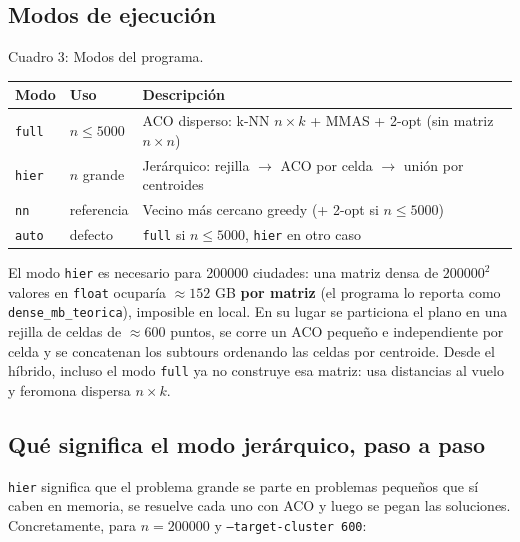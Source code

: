 \documentclass[12pt,a4paper]{article}
\begin{document}
\subsection{Modos de ejecución}

Cuadro 3: Modos del programa.
\begin{center}
\begin{tabular}{lll}
\toprule
Modo & Uso & Descripción \\
\midrule
\texttt{full} & $n \le 5000$ & ACO disperso: k-NN $n \times k$ + MMAS + 2-opt (sin matriz $n \times n$) \\
\texttt{hier} & $n$ grande & Jerárquico: rejilla $\to$ ACO por celda $\to$ unión por centroides \\
\texttt{nn} & referencia & Vecino más cercano greedy (+ 2-opt si $n \le 5000$) \\
\texttt{auto} & defecto & \texttt{full} si $n \le 5000$, \texttt{hier} en otro caso \\
\bottomrule
\end{tabular}
\end{center}

El modo \texttt{hier} es necesario para 200000 ciudades: una matriz densa de
$200000^2$ valores en \texttt{float} ocuparía $\approx 152$ GB \textbf{por
matriz} (el programa lo reporta como \texttt{dense\_mb\_teorica}), imposible en
local. En su lugar se particiona el plano en una rejilla de celdas de
$\approx 600$ puntos, se corre un ACO pequeño e independiente por celda y se
concatenan los subtours ordenando las celdas por centroide. Desde el híbrido,
incluso el modo \texttt{full} ya no construye esa matriz: usa distancias al
vuelo y feromona dispersa $n \times k$.

\subsection{Qué significa el modo jerárquico, paso a paso}

\texttt{hier} significa que el problema grande se parte en problemas pequeños
que sí caben en memoria, se resuelve cada uno con ACO y luego se pegan las
soluciones. Concretamente, para $n = 200000$ y
\texttt{--target-cluster 600}:
\end{document}
